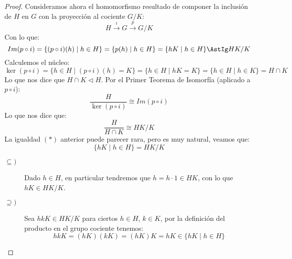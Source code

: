 \begin{teo}
\begin{proof}
        \noindent
        Consideramos ahora el homomorfismo resultado de componer la inclusión de $H$ en $G$ con la proyección al cociente $G/K$:
        \begin{equation*}
            H\stackrel{i}{\longrightarrow} G \stackrel{p}{\longrightarrow} G/K
        \end{equation*}
        Con lo que:
        \begin{equation*}
            Im(p\circ i) = \{(p\circ i)(h) \mid h \in H\} = \{p(h) \mid h \in H \} = \{hK \mid h\in H\} \AstIg HK/K
        \end{equation*}
        Calculemos el núcleo:
        \begin{equation*}
            \ker(p\circ i) = \{h\in H \mid (p\circ i)(h) = K\} = \{h\in H \mid hK = K\} = \{h\in H \mid h\in K\} = H\cap K
        \end{equation*}
        Lo que nos dice que $H\cap K\lhd H$. Por el Primer Teorema de Isomorfía (aplicado a $p\circ i$):
        \begin{equation*}
            \dfrac{H}{\ker(p\circ i)} \cong Im(p\circ i)
        \end{equation*}
        Lo que nos dice que:
        \begin{equation*}
            \dfrac{H}{H\cap K} \cong HK/K
        \end{equation*}
        La igualdad $(\ast)$ anterior puede parecer rara, pero es muy natural, veamos que:
        \begin{equation*}
            \{hK\mid h \in H\} = HK/K
        \end{equation*}
        \begin{description}
            \item [$\subseteq)$] Dado $h\in H$, en particular tendremos que $h = h\cdot 1 \in HK$, con lo que ${hK \in HK/K}$.
            \item [$\supseteq)$] Sea $hkK\in HK/K$ para ciertos $h\in H$, $k\in K$, por la definición del producto en el grupo cociente tenemos:
                \begin{equation*}
                    hkK = (hK)(kK) = (hK)K = hK \in \{hK \mid h\in H\}
                \end{equation*} \qedhere
        \end{description}
    \end{proof}
\end{teo}

